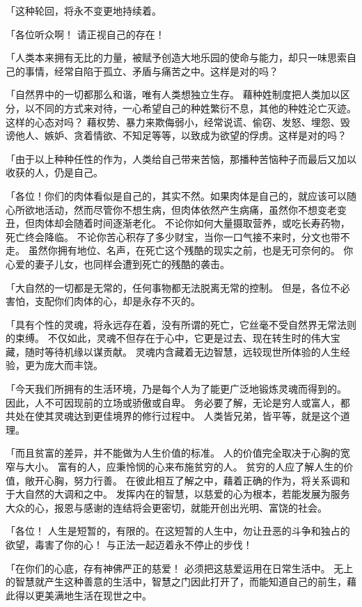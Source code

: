 \documentclass[twoside,openany]{book}
\begin{document}
「这种轮回，将永不变更地持续着。

「各位听众啊！
请正视自己的存在！

「人类本来拥有无比的力量，被赋予创造大地乐园的使命与能力，却只一味思索自己的事情，经常自陷于孤立、矛盾与痛苦之中。这样是对的吗？

「自然界中的一切都那么和谐，唯有人类想独立生存。
藉种姓制度把人类加以区分，以不同的方式来对待，一心希望自己的种姓繁衍不息，其他的种姓沦亡灭迹。这样的心态对吗？
藉权势、暴力来欺侮弱小，经常说谎、偷窃、发怒、埋怨、毁谤他人、嫉妒、贪着情欲、不知足等等，以致成为欲望的俘虏。这样是对的吗？

「由于以上种种任性的作为，人类给自己带来苦恼，那播种苦恼种子而最后又加以收获的人，仍是自己。

「各位！你们的肉体看似是自己的，其实不然。如果肉体是自己的，就应该可以随心所欲地活动，然而尽管你不想生病，但肉体依然产生病痛，虽然你不想变老变丑，但肉体却会随着时间逐渐老化。
不论你如何大量摄取营养，或吃长寿药物，死亡终会降临。
不论你苦心积存了多少财宝，当你一口气接不来时，分文也带不走。
虽然你拥有地位、名声，在死亡这个残酷的现实之前，也是无可奈何的。
你心爱的妻子儿女，也同样会遭到死亡的残酷的袭击。

「大自然的一切都是无常的，任何事物都无法脱离无常的控制。
但是，各位不必害怕，支配你们肉体的心，却是永存不灭的。

「具有个性的灵魂，将永远存在着，没有所谓的死亡，它丝毫不受自然界无常法则的束缚。
不仅如此，灵魂不但存在于心中，它更是过去、现在转生时的伟大宝藏，随时等待机缘以谋贡献。
灵魂内含藏着无边智慧，远较现世所体验的人生经验，更为庞大而丰饶。

「今天我们所拥有的生活环境，乃是每个人为了能更广泛地锻炼灵魂而得到的。
因此，人不可因现前的立场或骄傲或自卑。
务必要了解，无论是穷人或富人，都共处在使其灵魂达到更佳境界的修行过程中。
人类皆兄弟，皆平等，就是这个道理。

「而且贫富的差异，并不能做为人生价值的标准。
人的价值完全取决于心胸的宽窄与大小。
富有的人，应秉怜悯的心来布施贫穷的人。
贫穷的人应了解人生的价值，敞开心胸，努力行善。
在彼此相互了解之中，藉着正确的作为，将关系调和于大自然的大调和之中。
发挥内在的智慧，以慈爱的心为根本，若能发展为服务大众的心，报恩与感谢的连结将会更密切，就能开创出光明、富饶的社会。

「各位！
人生是短暂的，有限的。在这短暂的人生中，勿让丑恶的斗争和独占的欲望，毒害了你的心！
与正法一起迈着永不停止的步伐！

「在你们的心底，存有神佛严正的慈爱！
必须把这慈爱运用在日常生活中。
无上的智慧就产生这种善意的生活中，智慧之门因此打开了，而能知道自己的前生，藉此得以更美满地生活在现世之中。
\end{document}

